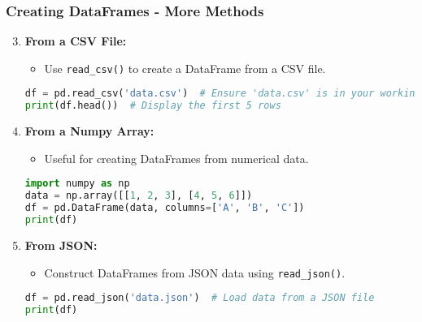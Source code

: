 \documentclass[aspectratio=169]{beamer}
\begin{document}
\begin{frame}[fragile]
    \frametitle{Creating DataFrames - More Methods}
    \begin{enumerate}
        \setcounter{enumi}{2}
        \item \textbf{From a CSV File:}
            \begin{itemize}
                \item Use \texttt{read\_csv()} to create a DataFrame from a CSV file.
            \end{itemize}
            \begin{lstlisting}[language=Python]
df = pd.read_csv('data.csv')  # Ensure 'data.csv' is in your working directory
print(df.head())  # Display the first 5 rows
            \end{lstlisting}

        \item \textbf{From a Numpy Array:}
            \begin{itemize}
                \item Useful for creating DataFrames from numerical data.
            \end{itemize}
            \begin{lstlisting}[language=Python]
import numpy as np
data = np.array([[1, 2, 3], [4, 5, 6]])
df = pd.DataFrame(data, columns=['A', 'B', 'C'])
print(df)
            \end{lstlisting}

        \item \textbf{From JSON:}
            \begin{itemize}
                \item Construct DataFrames from JSON data using \texttt{read\_json()}.
            \end{itemize}
            \begin{lstlisting}[language=Python]
df = pd.read_json('data.json')  # Load data from a JSON file
print(df)
            \end{lstlisting}
    \end{enumerate}
\end{frame}
\end{document}
